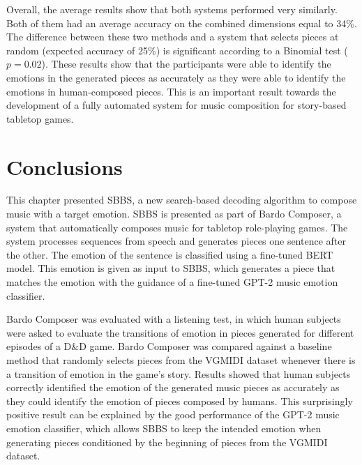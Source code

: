 Overall, the average results show that both systems performed very similarly. Both of them had an average accuracy on the combined dimensions equal to 34\%. The difference between these two methods and a system that selects pieces at random (expected accuracy of 25\%) is significant according to a Binomial test ($p = 0.02$). These results show that the participants  were  able  to  identify  the  emotions in the generated pieces as accurately as they were able to identify the emotions in human-composed pieces. This is an important result towards the development of a fully automated system for music composition for story-based tabletop games.

\section{Conclusions}

This chapter presented SBBS, a new search-based decoding algorithm to compose music with a target emotion. SBBS is presented as part of Bardo Composer, a system that automatically composes music for tabletop role-playing games. The system processes sequences from speech and generates pieces one sentence after the other. The emotion of the sentence is classified using a fine-tuned BERT model. This emotion is given as input to SBBS, which generates a piece that matches the emotion with the guidance of a fine-tuned GPT-2 music emotion classifier.

Bardo Composer was evaluated with a listening test, in which human subjects were asked to evaluate the transitions of emotion in pieces generated for different episodes of a D\&D game. Bardo Composer was compared against a baseline method that randomly selects pieces from the VGMIDI dataset whenever there is a transition of emotion in the game's story. Results showed that human subjects correctly identified the emotion of the generated music pieces as accurately as they could identify the emotion of pieces composed by humans. This surprisingly positive result can be explained by the good performance of the GPT-2 music emotion classifier, which allows SBBS to keep the intended emotion when generating pieces conditioned by the beginning of pieces from the VGMIDI dataset.
